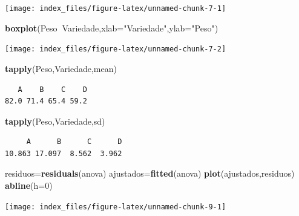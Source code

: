 \documentclass[12pt,brazil,oneside]{book}
\newenvironment{Shaded}{\begin{snugshade}}{\end{snugshade}}
\newcommand{\DataTypeTok}[1]{\textcolor[rgb]{0.13,0.29,0.53}{#1}}
\newcommand{\DecValTok}[1]{\textcolor[rgb]{0.00,0.00,0.81}{#1}}
\newcommand{\KeywordTok}[1]{\textcolor[rgb]{0.13,0.29,0.53}{\textbf{#1}}}
\newcommand{\NormalTok}[1]{#1}
\newcommand{\OperatorTok}[1]{\textcolor[rgb]{0.81,0.36,0.00}{\textbf{#1}}}
\newcommand{\StringTok}[1]{\textcolor[rgb]{0.31,0.60,0.02}{#1}}
\begin{document}
\begin{center}\texttt{[image: index\_files/figure-latex/unnamed-chunk-7-1]} \end{center}

\begin{Shaded}
\begin{Highlighting}[]
\KeywordTok{boxplot}\NormalTok{(Peso}\OperatorTok{~}\NormalTok{Variedade,}\DataTypeTok{xlab=}\StringTok{"Variedade"}\NormalTok{,}\DataTypeTok{ylab=}\StringTok{"Peso"}\NormalTok{)}
\end{Highlighting}
\end{Shaded}

\begin{center}\texttt{[image: index\_files/figure-latex/unnamed-chunk-7-2]} \end{center}

\begin{Shaded}
\begin{Highlighting}[]
\KeywordTok{tapply}\NormalTok{(Peso,Variedade,mean)}
\end{Highlighting}
\end{Shaded}

\begin{verbatim}
   A    B    C    D 
82.0 71.4 65.4 59.2 
\end{verbatim}

\begin{Shaded}
\begin{Highlighting}[]
\KeywordTok{tapply}\NormalTok{(Peso,Variedade,sd)}
\end{Highlighting}
\end{Shaded}

\begin{verbatim}
     A      B      C      D 
10.863 17.097  8.562  3.962 
\end{verbatim}

\begin{Shaded}
\begin{Highlighting}[]
\NormalTok{residuos=}\KeywordTok{residuals}\NormalTok{(anova)}
\NormalTok{ajustados=}\KeywordTok{fitted}\NormalTok{(anova)}
\KeywordTok{plot}\NormalTok{(ajustados,residuos)}
\KeywordTok{abline}\NormalTok{(}\DataTypeTok{h=}\DecValTok{0}\NormalTok{)}
\end{Highlighting}
\end{Shaded}

\begin{center}\texttt{[image: index\_files/figure-latex/unnamed-chunk-9-1]} \end{center}
\end{document}
